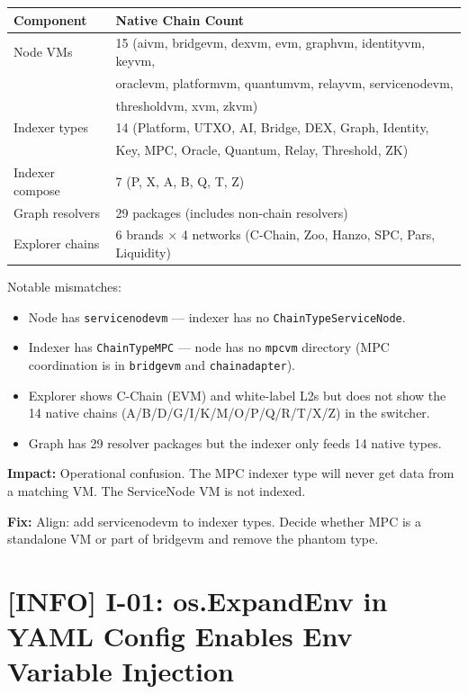 \documentclass{article}
\begin{document}
\begin{center}
\begin{tabular}{ll}
\toprule
\textbf{Component} & \textbf{Native Chain Count} \\
\midrule
Node VMs & 15 (aivm, bridgevm, dexvm, evm, graphvm, identityvm, keyvm, \\
         & oraclevm, platformvm, quantumvm, relayvm, servicenodevm, \\
         & thresholdvm, xvm, zkvm) \\
Indexer types & 14 (Platform, UTXO, AI, Bridge, DEX, Graph, Identity, \\
              & Key, MPC, Oracle, Quantum, Relay, Threshold, ZK) \\
Indexer compose & 7 (P, X, A, B, Q, T, Z) \\
Graph resolvers & 29 packages (includes non-chain resolvers) \\
Explorer chains & 6 brands $\times$ 4 networks (C-Chain, Zoo, Hanzo, SPC, Pars, Liquidity) \\
\bottomrule
\end{tabular}
\end{center}

Notable mismatches:
\begin{itemize}
  \item Node has \texttt{servicenodevm} --- indexer has no \texttt{ChainTypeServiceNode}.
  \item Indexer has \texttt{ChainTypeMPC} --- node has no \texttt{mpcvm} directory
        (MPC coordination is in \texttt{bridgevm} and \texttt{chainadapter}).
  \item Explorer shows C-Chain (EVM) and white-label L2s but does not show
        the 14 native chains (A/B/D/G/I/K/M/O/P/Q/R/T/X/Z) in the switcher.
  \item Graph has 29 resolver packages but the indexer only feeds 14 native types.
\end{itemize}

\textbf{Impact:} Operational confusion. The MPC indexer type will never get
data from a matching VM. The ServiceNode VM is not indexed.

\textbf{Fix:} Align: add servicenodevm to indexer types. Decide whether
MPC is a standalone VM or part of bridgevm and remove the phantom type.


\section{[INFO] I-01: os.ExpandEnv in YAML Config Enables Env Variable Injection}
\end{document}

